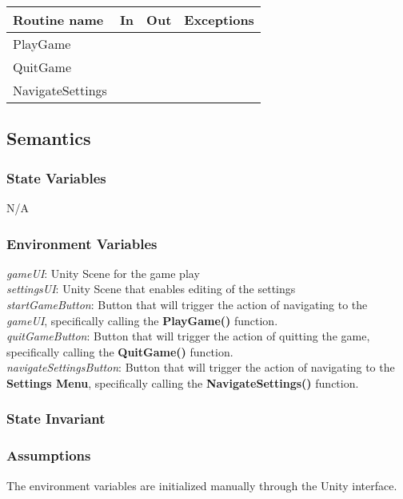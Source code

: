 \documentclass[12pt]{article}
\begin{document}
\begin{tabular}{| l | l | l | l |}
\hline
\textbf{Routine name} & \textbf{In} & \textbf{Out} & \textbf{Exceptions}\\
\hline
PlayGame & & & \\
\hline
QuitGame & & & \\
\hline
NavigateSettings & & & \\
\hline
\end{tabular}

\subsection {Semantics}

\subsubsection {State Variables}
N/A

\subsubsection {Environment Variables}
\textit{gameUI}: Unity Scene for the game play\\

\noindent \textit{settingsUI}: Unity Scene that enables editing of the settings\\

\noindent \textit{startGameButton}: Button that will trigger the action of navigating to the \textit{gameUI}, specifically calling  the \textbf{PlayGame()} function.\\

\noindent \textit{quitGameButton}: Button that will trigger the action of quitting the game, specifically calling the \textbf{QuitGame()} function.\\

\noindent \textit{navigateSettingsButton}: Button that will trigger the action of navigating to the \textbf{Settings Menu}, specifically calling the \textbf{NavigateSettings()} function.\\

\subsubsection {State Invariant}

\subsubsection {Assumptions}
The environment variables are initialized manually through the Unity interface.
\end{document}
